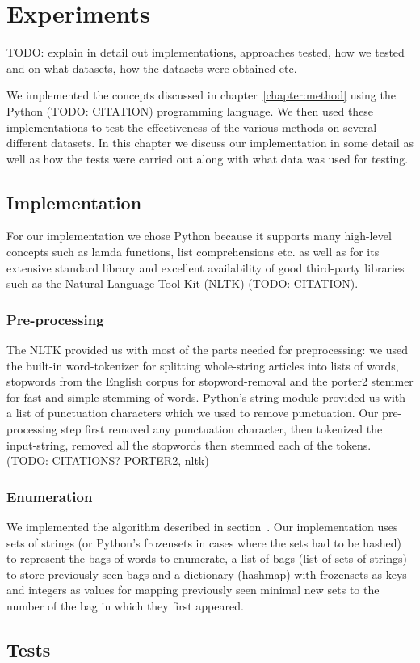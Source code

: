 \chapter{Experiments}
\label{chapter:experiments}
TODO: explain in detail out implementations, approaches tested, how we tested and on what datasets, how the datasets were obtained etc.

We implemented the concepts discussed in chapter~\ref{chapter:method} using the Python (TODO: CITATION) programming language. We then used these implementations to test the effectiveness of the various methods on several different datasets. In this chapter we discuss our implementation in some detail as well as how the tests were carried out along with what data was used for testing.

\section{Implementation}
For our implementation we chose Python because it supports many high-level concepts such as lamda functions, list comprehensions etc. as well as for its extensive standard library and excellent availability of good third-party libraries such as the Natural Language Tool Kit (NLTK) (TODO: CITATION).

\subsection{Pre-processing}
The NLTK provided us with most of the parts needed for preprocessing: we used the built-in word-tokenizer for splitting whole-string articles into lists of words,  stopwords from the English corpus for stopword-removal and the porter2 stemmer for fast and simple stemming of words. Python's string module provided us with a list of punctuation characters which we used to remove punctuation. Our pre-processing step first removed any punctuation character, then tokenized the input-string, removed all the stopwords then stemmed each of the tokens. (TODO: CITATIONS? PORTER2, nltk)

\subsection{Enumeration}
We implemented the algorithm described in section~\label{method:enumeration}. Our implementation uses sets of strings (or Python's frozensets in cases where the sets had to be hashed) to represent the bags of words to enumerate, a list of bags (list of sets of strings) to store previously seen bags and a dictionary (hashmap) with frozensets as keys and integers as values for mapping previously seen minimal new sets to the number of the bag in which they first appeared.

\section{Tests}


